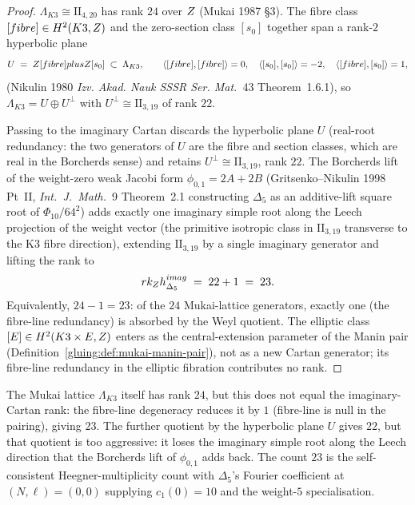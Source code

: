 \begin{proof}
$\Lambda_{K3} \cong \mathrm{II}_{4,20}$ has rank $24$ over $Z$
(Mukai 1987 \S 3). The fibre class $[fibre] \in H^2(K3,
Z)$ and the zero-section class $[s_0]$ together span a rank-$2$
hyperbolic plane
\[
 U \;=\; Z[fibre] plus Z[s_0] \;\subset\; \Lambda_{K3},
 \qquad
 \langle [fibre], [fibre]\rangle = 0,\quad
 \langle [s_0], [s_0]\rangle = -2,\quad
 \langle [fibre], [s_0]\rangle = 1,
\]
(Nikulin 1980 \emph{Izv. Akad. Nauk SSSR Ser. Mat.}~43 Theorem~1.6.1),
so $\Lambda_{K3} = U \oplus U^\perp$ with $U^\perp \cong
\mathrm{II}_{3, 19}$ of rank $22$.

Passing to the imaginary Cartan discards the hyperbolic plane $U$
(real-root redundancy: the two generators of $U$ are the fibre and
section classes, which are real in the Borcherds sense) and retains
$U^\perp \cong \mathrm{II}_{3, 19}$, rank $22$. The Borcherds lift
of the weight-zero weak Jacobi form $\phi_{0, 1} = 2A + 2B$
(Gritsenko--Nikulin 1998 Pt~II, \emph{Int.\ J.\ Math.}~9
Theorem~2.1 constructing $\Delta_5$ as an additive-lift square
root of $\Phi_{10} / 64^2$) adds exactly one imaginary simple root
along the Leech projection of the weight vector (the primitive
isotropic class in $\mathrm{II}_{3, 19}$ transverse to the K3
fibre direction), extending $\mathrm{II}_{3, 19}$ by a single
imaginary generator and lifting the rank to
\[
 rk_{Z} h^{imag}_{\Delta_5} \;=\; 22 + 1 \;=\; 23.
\]
Equivalently, $24 - 1 = 23$: of the $24$ Mukai-lattice generators,
exactly one (the fibre-line redundancy) is absorbed by the Weyl
quotient. The elliptic class $[E] \in H^2(K3 \times E, Z)$ enters
as the central-extension parameter of the Manin pair
(Definition~\ref{gluing:def:mukai-manin-pair}), not as a new Cartan
generator; its fibre-line redundancy in the elliptic fibration
contributes no rank.
\end{proof}

\begin{remark}
\label{gluing:rem:imaginary-cartan-rank}
The Mukai lattice $\Lambda_{K3}$ itself has rank $24$, but this
does not equal the imaginary-Cartan rank: the fibre-line degeneracy
reduces it by $1$ (fibre-line is null in the pairing), giving $23$.
The further quotient by the hyperbolic plane $U$ gives $22$,
but that quotient is too aggressive: it loses the imaginary
simple root along the Leech direction that the Borcherds lift of
$\phi_{0,1}$ adds back. The count $23$ is the self-consistent
Heegner-multiplicity count with $\Delta_5$'s Fourier coefficient at
$(N, \ell) = (0, 0)$ supplying $c_1(0) = 10$ and the weight-$5$
specialisation.
\end{remark}


